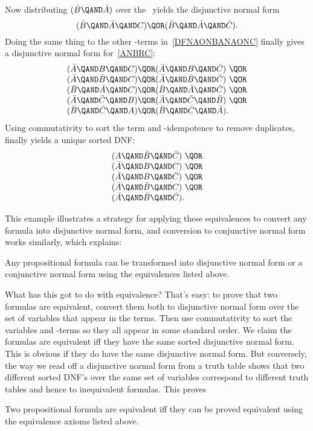 Now distributing $(\bar{B} \QAND \bar{A})$ over the \QOR\ yields the
disjunctive normal form
\[
(\bar{B} \QAND \bar{A} \QAND C) \QOR
(\bar{B} \QAND \bar{A} \QAND \bar{C}).
\]
Doing the same thing to the other \QAND-terms in~\eqref{DFNAONBANAONC}
finally gives a disjunctive normal form for~\eqref{ANBRC}:
\[\begin{array}{l}
(\bar{A} \QAND B \QAND C) \QOR (\bar{A} \QAND B \QAND \bar{C})\ \QOR\\
(\bar{A} \QAND \bar{B} \QAND C) \QOR  (\bar{A} \QAND \bar{B} \QAND \bar{C})\ \QOR\\
(\bar{B} \QAND \bar{A} \QAND C) \QOR  (\bar{B} \QAND \bar{A} \QAND \bar{C})\ \QOR\\
(\bar{A} \QAND \bar{C} \QAND B) \QOR  (\bar{A} \QAND \bar{C} \QAND \bar{B})\ \QOR\\
(\bar{B} \QAND \bar{C} \QAND A) \QOR  (\bar{B} \QAND \bar{C} \QAND \bar{A}).
\end{array}\]
Using commutativity to sort the term and \QOR-idempotence to remove
duplicates, finally yields a unique sorted DNF:
\[\begin{array}{l}
(A \QAND \bar{B} \QAND \bar{C})\ \QOR\\
(\bar{A} \QAND B \QAND C)\ \QOR\\
(\bar{A} \QAND B \QAND \bar{C})\ \QOR\\
(\bar{A} \QAND \bar{B} \QAND C)\ \QOR\\
(\bar{A} \QAND \bar{B} \QAND \bar{C}).
\end{array}\]

This example illustrates a strategy for applying these equivalences to
convert any formula into disjunctive normal form, and conversion to
conjunctive normal form works similarly, which explains:
\begin{theorem}\label{completeDNF}
Any propositional formula can be transformed into disjunctive
  normal form%
 or a conjunctive normal form%
using the equivalences listed above.
\end{theorem}

What has this got to do with equivalence?  That's easy: to prove that
two formulas are equivalent, convert them both to disjunctive normal
form over the set of variables that appear in the terms.  Then use
commutativity to sort the variables and \QAND-terms so they all appear
in some standard order.  We claim the formulas are equivalent iff they
have the same sorted disjunctive normal form.  This is obvious if they
do have the same disjunctive normal form.  But conversely, the way we
read off a disjunctive normal form from a truth table shows that two
different sorted DNF's over the same set of variables correspond to
different truth tables and hence to inequivalent formulas.  This
proves
\begin{theorem}
\label{complete_equivalence}
Two propositional formula are equivalent iff they can be proved
equivalent using the equivalence axioms listed above.
\end{theorem}

